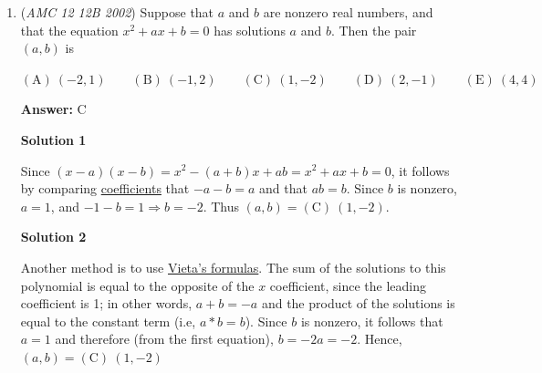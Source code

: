 \begin{enumerate}
 $\mathrm{(A)}\ 72 \qquad\mathrm{(B)}\ 84 \qquad\mathrm{(C)}\ 90 \qquad\mathrm{(D)}\ 108 \qquad\mathrm{(E)}\ 120$

 \textbf{Answer: }D



\textbf{Solution 1}

The sum of the degree measures of the angles of a pentagon (as a pentagon can be split into $5- 2 = 3$ triangles) is $3 \cdot 180 = 540^{\circ}$. If we let $v = x - 2d, w = x - d, y = x + d, z = x+2d$, it follows that 

 
 \[(x-2d)+(x-d)+x+(x+d)+(x+2d) = 5x = 540 \Longrightarrow x = 108 \ \mathrm{(D)}\]

 Note that since $x$ is the middle term of an arithmetic sequence with an odd number of terms, it is simply the average of the sequence.

 You can always assume the values are the same so $\frac{540}{5}=108$




\textbf{Solution 2}

Let $v$, $w$, $x$, $y$, $z$ be $v$, $v + d$, $v+2d$, $v+3d$, $v+4d$, respectively. Then we have 
 \[v + w + x + y + z = 5v + 10d = 180^{\circ} (5 - 2) = 540^{\circ}\]Dividing the equation by $5$, we have 
 \[v + 2d = x = 108^{\circ} \mathrm {(D)}\]



	\item (\textit{AMC 12 12B 2002}) Suppose that $a$ and $b$ are nonzero real numbers, and that the equation $x^2 + ax + b = 0$ has solutions $a$ and $b$. Then the pair $(a,b)$ is


 $\mathrm{(A)}\ (-2,1) \qquad\mathrm{(B)}\ (-1,2) \qquad\mathrm{(C)}\ (1,-2) \qquad\mathrm{(D)}\ (2,-1) \qquad\mathrm{(E)}\ (4,4)$

 \textbf{Answer: }C



\textbf{Solution 1}

Since $(x-a)(x-b) = x^2 - (a+b)x + ab = x^2 + ax + b = 0$, it follows by comparing \href{https://artofproblemsolving.com/wiki/index.php?title=Coefficient}{coefficients} that $-a - b = a$ and that $ab = b$. Since $b$ is nonzero, $a = 1$, and $-1 - b = 1 \Longrightarrow b = -2$. Thus $(a,b) = \boxed{\mathrm{(C)}\ (1,-2)}$.

 



\textbf{Solution 2}

Another method is to use \href{https://artofproblemsolving.com/wiki/index.php?title=Vieta\%27s\_formulas}{Vieta's formulas}. The sum of the solutions to this polynomial is equal to the opposite of the $x$ coefficient, since the leading coefficient is 1; in other words, $a + b = -a$ and the product of the solutions is equal to the constant term (i.e, $a*b = b$). Since $b$ is nonzero, it follows that $a = 1$ and therefore (from the first equation), $b = -2a = -2$. Hence, $(a,b) = \boxed{\mathrm{(C)}\ (1,-2)}$





\end{enumerate}
